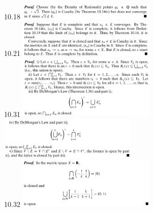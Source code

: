 \documentclass[3pt,landscape]{article}
\begin{document}
\begin{multicols}{3}
    10.18
    \includegraphics[width=250]{10_18.png} \\
    10.21
    \includegraphics[width=250]{10_21.png} \\
    10.31
    \includegraphics[width=250]{10_31a.png} \\
    \includegraphics[width=250]{10_31b.png} \\
    10.32
    \includegraphics[width=250]{10_32.png} \\

\end{multicols}
\end{document}
